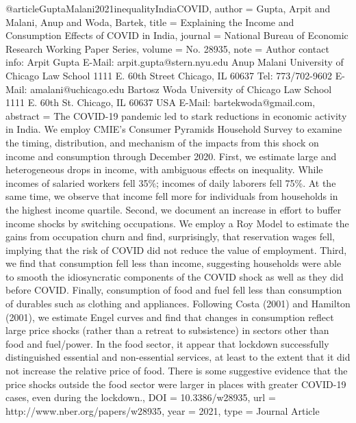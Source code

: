 {{{{@article{GuptaMalani2021inequalityIndiaCOVID,
   author = {Gupta, Arpit and Malani, Anup and Woda, Bartek},
   title = {Explaining the Income and Consumption Effects of COVID in India},
   journal = {National Bureau of Economic Research Working Paper Series},
   volume = {No. 28935},
   note = {Author contact info: Arpit Gupta E-Mail: arpit.gupta@stern.nyu.edu Anup Malani University of Chicago Law School 1111 E. 60th Street Chicago, IL 60637 Tel: 773/702-9602 E-Mail: amalani@uchicago.edu Bartosz Woda University of Chicago Law School 1111 E. 60th St. Chicago, IL 60637 USA E-Mail: bartekwoda@gmail.com},
   abstract = {The COVID-19 pandemic led to stark reductions in economic activity in India. We employ CMIE's Consumer Pyramids Household Survey to examine the timing, distribution, and mechanism of the impacts from this shock on income and consumption through December 2020. First, we estimate large and heterogeneous drops in income, with ambiguous effects on inequality. While incomes of salaried workers fell 35\%; incomes of daily laborers fell 75\%. At the same time, we observe that income fell more for individuals from households in the highest income quartile. Second, we document an increase in effort to buffer income shocks by switching occupations. We employ a Roy Model to estimate the gains from occupation churn and find, surprisingly, that reservation wages fell, implying that the risk of COVID did not reduce the value of employment. Third, we find that consumption fell less than income, suggesting households were able to smooth the idiosyncratic components of the COVID shock as well as they did before COVID. Finally, consumption of food and fuel fell less than consumption of durables such as clothing and appliances. Following Costa (2001) and Hamilton (2001), we estimate Engel curves and find that changes in consumption reflect large price shocks (rather than a retreat to subsistence) in sectors other than food and fuel/power. In the food sector, it appear that lockdown successfully distinguished essential and non-essential services, at least to the extent that it did not increase the relative price of food. There is some suggestive evidence that the price shocks outside the food sector were larger in places with greater COVID-19 cases, even during the lockdown.},
   DOI = {10.3386/w28935},
   url = {http://www.nber.org/papers/w28935},
   year = {2021},
   type = {Journal Article}
}

}}}}
